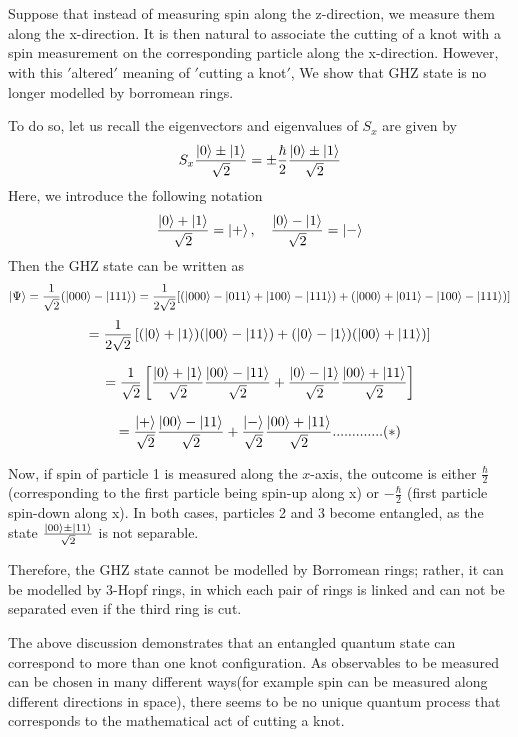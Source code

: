 \documentclass{article}
\begin{document}


\section{}
Suppose that instead of measuring spin along the z-direction, we measure them along the x-direction. It is then natural to associate the cutting of a knot with a spin measurement on the corresponding particle along the x-direction. However, with this $'$altered$'$ meaning of $'$cutting a knot$'$, We show that GHZ state is no longer modelled by borromean rings.

To do so, let us recall the eigenvectors and eigenvalues of $S_x$ are given by 
\[
S_x \frac{\ket{0}\pm\ket{1}}{\sqrt{2}} = \pm\frac{\hbar}{2} \frac{\ket{0}\pm\ket{1}}{\sqrt{2}}
\]
Here, we introduce the following notation
\[
\frac{\ket{0}+\ket{1}}{\sqrt{2}} = \ket{+} , \quad \frac{\ket{0}-\ket{1}}{\sqrt{2}} = \ket{-}
\]
Then the GHZ state can be written as 
\[
\ket{\Psi} = \frac{1}{\sqrt{2}} (\ket{000} - \ket{111})
= \frac{1}{2\sqrt{2}}[(\ket{000}-\ket{011}+\ket{100}-\ket{111})+(\ket{000}+\ket{011}-\ket{100}-\ket{111})]
\]
\[
= \frac{1}{2\sqrt{2}} \left[(\ket{0}+\ket{1})(\ket{00}-\ket{11})+(\ket{0}-\ket{1})(\ket{00}+\ket{11})\right]
\]

\[
= \frac{1}{\sqrt{2}} \left[ \frac{\ket{0}+\ket{1}}{\sqrt{2}} \frac{\ket{00}-\ket{11}}{\sqrt{2}} + \frac{\ket{0}-\ket{1}}{\sqrt{2}} \frac{\ket{00}+\ket{11}}{\sqrt{2}} \right]
\]

\[
 = \frac{\ket{+}}{\sqrt{2}}\frac{\ket{00}-\ket{11}}{\sqrt{2}} + \frac{\ket{-}}{\sqrt{2}}\frac{\ket{00}+\ket{11}}{\sqrt{2}}.............(*)
\]

Now, if spin of particle 1 is measured along the $x$-axis, the outcome is either $\frac{\hbar}{2}$ (corresponding to the first particle being spin-up along x) or $-\frac{\hbar}{2}$ (first particle spin-down along x). In both cases, particles 2 and 3 become entangled, as the state $\frac{\ket{00} \pm \ket{11}}{\sqrt{2}}$ is not separable.

Therefore, the GHZ state cannot be modelled by Borromean rings; rather, it can be modelled by 3-Hopf rings, in which each pair of rings is linked and can not be separated even if the third ring is cut.

The above discussion demonstrates that an entangled quantum state can correspond to more than one knot configuration. As observables to be measured can be chosen in many different ways(for example spin can be measured along different directions in space), there seems to be no unique quantum process that corresponds to the mathematical act of cutting a knot. 
\end{document}
